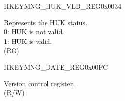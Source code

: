 \begin{register}{H}{KEYMNG\_HUK\_VLD\_REG}{0x0034}\label{regdesc:KEYMNGHUKVLDREG}
%
%
\regnewline%
\begin{regdesc}\begin{reglist}
\label{fielddesc:KEYMNGHUKVALID}\item [KEYMNG\_HUK\_VALID] Represents the HUK status. \\
0: HUK is not valid.\\
1: HUK is valid.\\
(RO)
\end{reglist}\end{regdesc}
\end{register}


\begin{register}{H}{KEYMNG\_DATE\_REG}{0x00FC}\label{regdesc:KEYMNGDATEREG}
%
%
\regnewline%
\begin{regdesc}\begin{reglist}
\label{fielddesc:KEYMNGDATE}\item [KEYMNG\_DATE] Version control register. \\
(R/W)
\end{reglist}\end{regdesc}
\end{register}

